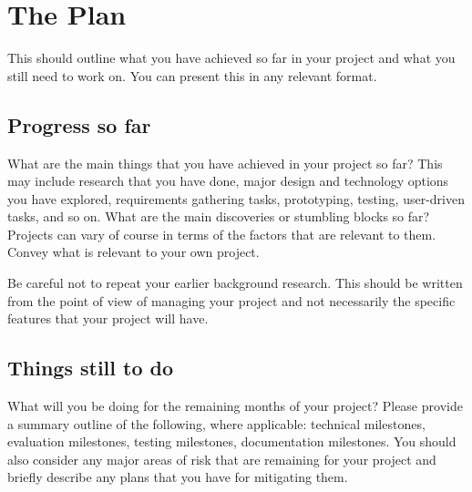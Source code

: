 \section{The Plan}
This should outline what you have achieved so far in your project and what you still need to work on. You can present this in any relevant format. 

\subsection{Progress so far}
What are the main things that you have achieved in your project so far? This may include research that you have done, major design and technology options you have explored, requirements gathering tasks, prototyping, testing, user-driven tasks, and so on. What are the main discoveries or stumbling blocks so far? Projects can vary of course in terms of the factors that are relevant to them. Convey what is relevant to your own project.

Be careful not to repeat your earlier background research. This should be written from the point of view of managing your project and not necessarily the specific features that your project will have. 
\subsection{Things still to do}
What will you be doing for the remaining months of your project? Please provide a summary outline of the following, where applicable: technical milestones, evaluation milestones, testing milestones, documentation milestones. You should also consider any major areas of risk that are remaining for your project and briefly describe any plans that you have for mitigating them.